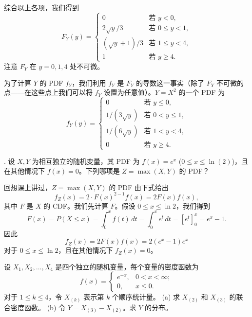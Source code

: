 \begin{questions}
\begin{solution}
综合以上各项，我们得到
\[
F_Y(y) = \begin{cases} 0 & \text{若 } y < 0, \\ 2\sqrt{y}/3 & \text{若 } 0 \le y < 1, \\ (\sqrt{y} + 1)/3 & \text{若 } 1 \le y < 4, \\ 1 & \text{若 } y \ge 4. \end{cases}
\]
注意 $F_Y$ 在 $y = 0, 1, 4$ 处不可微。

为了计算 $Y$ 的 PDF $f_Y$，我们利用 $f_Y$ 是 $F_Y$ 的导数这一事实（除了 $F_Y$ 不可微的点——在这些点上我们可以将 $f_Y$ 设置为任意值）。$Y = X^2$ 的一个 PDF 为
\[
f_Y(y) = \begin{cases} 0 & \text{若 } y \le 0, \\ 1/(3\sqrt{y}) & \text{若 } 0 < y \le 1, \\ 1/(6\sqrt{y}) & \text{若 } 1 < y < 4, \\ 0 & \text{若 } y \ge 4. \end{cases}
\]
\end{solution}

. 设 $X, Y$ 为相互独立的随机变量，其 PDF 为 $f(x) = e^x$ ($0 \le x \le \ln(2)$)，且在其他情况下 $f(x) = 0$。下列哪项是 $Z = \max(X, Y)$ 的 PDF？

\begin{solution}
回想课上讲过，$Z = \max(X, Y)$ 的 PDF 由下式给出
\[
f_Z(x) = 2 \cdot F(x)^{2-1} f(x) = 2F(x)f(x),
\]
其中 $F$ 是 $X$ 的 CDF。我们先计算 $F$。假设 $0 \le x \le \ln 2$，我们得到
\[
F(x) = P(X \le x) = \int_0^x f(t) \, dt = \int_0^x e^t \, dt = \left[ e^t \right]_0^x = e^x - 1.
\]
因此
\[
f_Z(x) = 2F(x)f(x) = 2(e^x - 1)e^x
\]
对于 $0 \le x \le \ln 2$，且在其他情况下 $f_Z(x) = 0$。
\end{solution}

\question 设 $X_1, X_2, \dots, X_4$ 是四个独立的随机变量，每个变量的密度函数为
\[
f(x) = \begin{cases} e^{-x}, & 0 < x < \infty; \\ 0, & x \le 0. \end{cases}
\]
对于 $1 \le k \le 4$，令 $X_{(k)}$ 表示第 $k$ 个顺序统计量。
(a) 求 $X_{(2)}$ 和 $X_{(3)}$ 的联合密度函数。
(b) 令 $Y = X_{(3)} - X_{(2)}$。求 $Y$ 的分布。


\end{questions}

